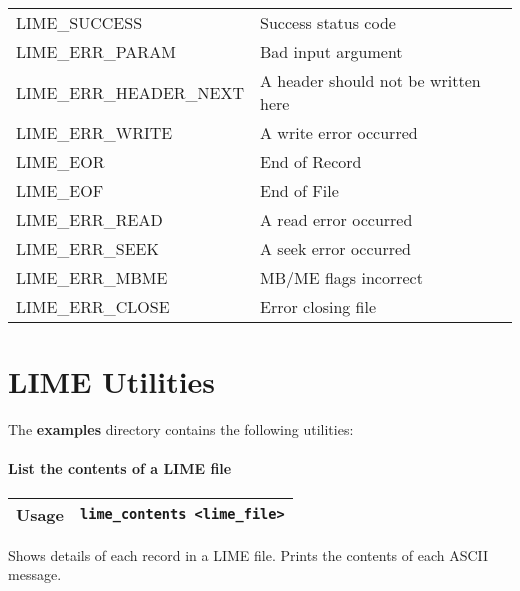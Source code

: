 \documentclass{article}
\begin{document}
\begin{center}
  \begin{tabular}{ll}
LIME\_SUCCESS              &  Success status code \\
LIME\_ERR\_PARAM            &  Bad input argument \\
LIME\_ERR\_HEADER\_NEXT      &  A header should not be written here \\
LIME\_ERR\_WRITE            &  A write error occurred \\
LIME\_EOR                  &  End of Record \\
LIME\_EOF                  &  End of File  \\
LIME\_ERR\_READ             &  A read error occurred \\
LIME\_ERR\_SEEK             &  A seek error occurred \\
LIME\_ERR\_MBME             &  MB/ME flags incorrect \\
LIME\_ERR\_CLOSE            &  Error closing file \\
  \end{tabular}
\end{center}

\section{LIME Utilities}

The {\bf examples} directory contains the following utilities:

\paragraph{List the contents of a LIME file}
%
\begin{flushleft}
  \begin{tabular}{|l|l|}
  \hline
  Usage     & \verb|lime_contents <lime_file>| \\
  \hline
 \end{tabular}
\end{flushleft}
%
Shows details of each record in a LIME file.  Prints the contents of
each ASCII message.
\end{document}
